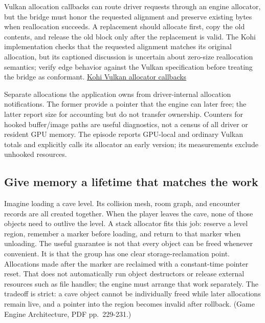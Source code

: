 Vulkan allocation callbacks can route driver requests through an engine allocator, but the bridge must honor the requested alignment and preserve existing bytes when reallocation succeeds. A replacement should allocate first, copy the old contents, and release the old block only after the replacement is valid. The Kohi implementation checks that the requested alignment matches its original allocation, but its captioned discussion is uncertain about zero-size reallocation semantics; verify edge behavior against the Vulkan specification before treating the bridge as conformant. \href{https://www.youtube.com/watch?v=F9hN1PrxnHE}{Kohi Vulkan allocator callbacks}

Separate allocations the application owns from driver-internal allocation notifications. The former provide a pointer that the engine can later free; the latter report size for accounting but do not transfer ownership. Counters for hooked buffer/image paths are useful diagnostics, not a census of all driver or resident GPU memory. The episode reports GPU-local and ordinary Vulkan totals and explicitly calls its allocator an early version; its measurements exclude unhooked resources.

\subsection{Give memory a lifetime that matches the work}\label{05-engine-i-ch014-give-memory-a-lifetime-that-matches-the-work}

\hypertarget{05-engine-i-ch014-give-memory-a-lifetime-that-matches-the-work}{}

Imagine loading a cave level. Its collision mesh, room graph, and encounter records are all created together. When the player leaves the cave, none of those objects need to outlive the level. A stack allocator fits this job: reserve a level region, remember a marker before loading, and return to that marker when unloading. The useful guarantee is not that every object can be freed whenever convenient. It is that the group has one clear storage-reclamation point. Allocations made after the marker are reclaimed with a constant-time pointer reset. That does not automatically run object destructors or release external resources such as file handles; the engine must arrange that work separately. The tradeoff is strict: a cave object cannot be individually freed while later allocations remain live, and a pointer into the region becomes invalid after rollback. (Game Engine Architecture, PDF pp.~229-231.)

